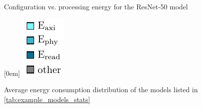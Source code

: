 \begin{figure}[hbtp]
    \centering
    \hfill
    \caption{Configuration vs. processing energy for the ResNet-50 model}
    \label{fig:resnet50_conf_proc}
\end{figure}

\begin{figure}[hbtp]
    \centering
    \hfill
    \subcaptionbox*{}[0em]{
        \includegraphics{assets/legend.pdf}
    }
    \hfill
    \caption{Average energy consumption distribution of the models listed in \cref{tab:example_models_stats}}
    \label{fig:example_models_avg_conf_proc}
\end{figure}
    
